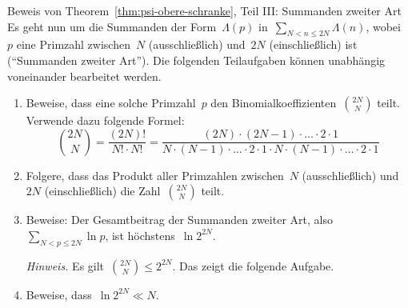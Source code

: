 \documentclass[twoside]{../zirkelblatt1415}
\theoremstyle{definition}
\theoremstyle{plain}
\theoremstyle{remark}
\begin{document}
\begin{aufgabe}{Beweis von Theorem~\ref{thm:psi-obere-schranke}, Teil III:
Summanden zweiter Art}
Es geht nun um die Summanden der Form~$\Lambda(p)$ in~$\sum_{N < n \leq 2N}
\Lambda(n)$, wobei~$p$ eine Primzahl zwischen~$N$ (ausschließlich) und~$2N$
(einschließlich) ist ("`Summanden zweiter Art"'). Die folgenden Teilaufgaben
können unabhängig voneinander bearbeitet werden.
\begin{enumerate}
\item Beweise, dass eine solche Primzahl~$p$ den
Binomialkoeffizienten~$\binom{2N}{N}$ teilt. Verwende dazu folgende Formel:
\[ \binom{2N}{N} = \frac{(2N)!}{N! \cdot N!} =
  \frac{(2N) \cdot (2N-1) \cdot \ldots \cdot 2 \cdot 1}{
  N \cdot (N-1) \cdot \ldots \cdot 2 \cdot 1 \cdot
  N \cdot (N-1) \cdot \ldots \cdot 2 \cdot 1} \]
\item Folgere, dass das Produkt aller Primzahlen zwischen~$N$
(ausschließlich) und~$2N$ (einschließlich) die Zahl~$\binom{2N}{N}$ teilt.
\item Beweise: Der Gesamtbeitrag der Summanden zweiter Art, also~$\sum_{N < p
\leq 2N} \ln p$, ist höchstens~$\ln 2^{2N}$.

\emph{Hinweis.} Es gilt~$\binom{2N}{N} \leq 2^{2N}$. Das zeigt die folgende
Aufgabe.
\item Beweise, dass~$\ln 2^{2N} \ll N$.
\end{enumerate}\fixlistspacing
\end{aufgabe}
\end{document}
